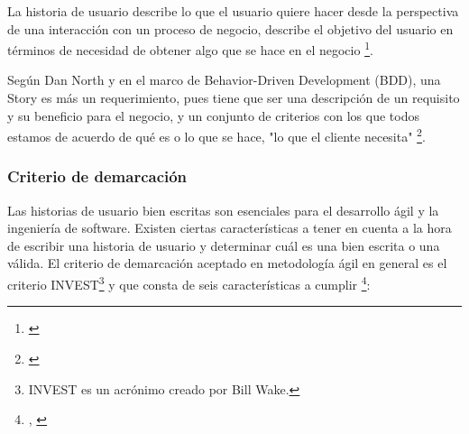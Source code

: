 La historia de usuario describe lo que el usuario quiere hacer desde la perspectiva de una interacción con un proceso de negocio, describe el objetivo del usuario en términos de necesidad de obtener algo que se hace en el negocio \footnote{\cite{Scott-Bellware-2008}}.

Según Dan North y en el marco de Behavior-Driven Development (BDD), una Story es más un requerimiento, pues tiene que ser una descripción de un requisito y su beneficio para el negocio, y un conjunto de criterios con los que todos estamos de acuerdo de qué es o lo que se hace, "lo que el cliente necesita" \footnote{\cite{Dan-North-2015}}. 

\subsubsection{Criterio de demarcación}

Las historias de usuario bien escritas son esenciales para el desarrollo ágil y la ingeniería de software. Existen ciertas características a tener en cuenta a la hora de escribir una historia de usuario y determinar cuál es una bien escrita o una válida. El criterio de demarcación aceptado en metodología ágil en general es el criterio INVEST\footnote{INVEST es un acrónimo creado por Bill Wake.} y que consta de seis características a cumplir \footnote{\cite{UNTREF-2014}, \cite{Scrum-Alliance-2015}}:

